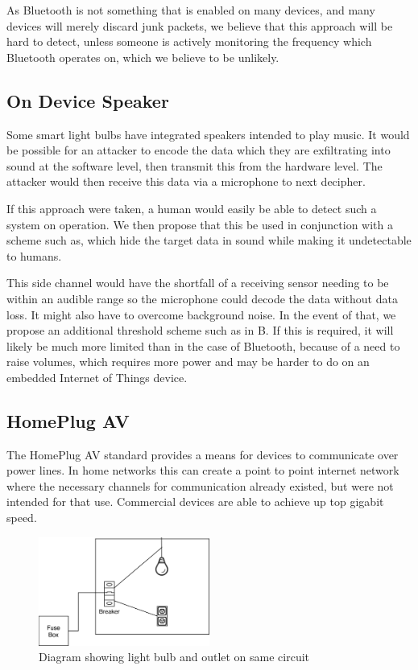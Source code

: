 \documentclass[conference]{IEEEtran}
\begin{document}
As Bluetooth is not something that is enabled on many devices, and many devices will merely discard junk packets, we believe that this approach will be hard to detect, unless someone is actively monitoring the frequency which Bluetooth operates on, which we believe to be unlikely.

\subsection{On Device Speaker}

Some smart light bulbs have integrated speakers intended to play music\cite{bt_speaker1}\cite{bt_speaker2}. It would be possible for an attacker to encode the data which they are exfiltrating into sound at the software level, then transmit this from the hardware level. The attacker would then receive this data via a microphone to next decipher. 

If this approach were taken, a human would easily be able to detect such a system on operation. We then propose that this be used in conjunction with a scheme such as\cite{bd_sound}\cite{co_noodle}, which hide the target data in sound while making it undetectable to humans. 

This side channel would have the shortfall of a receiving sensor needing to be within an audible range so the microphone could decode the data without data loss. It might also have to overcome background noise. In the event of that, we propose an additional threshold scheme such as in B. If this is required, it will likely be much more limited than in the case of Bluetooth, because of a need to raise volumes, which requires more power and may be harder to do on an embedded Internet of Things device.
\subsection{HomePlug AV}

The HomePlug AV standard provides a means for devices to communicate over power lines\cite{homeplug_spec}. In home networks this can create a point to point internet network where the necessary channels for communication already existed, but were not intended for that use. Commercial devices are able to achieve up top gigabit speed. 

\begin{figure}
  \centering
  \includegraphics[width=0.5\textwidth]{connection.png}
  \caption{Diagram showing light bulb and outlet on same circuit}
\end{figure}
\end{document}
